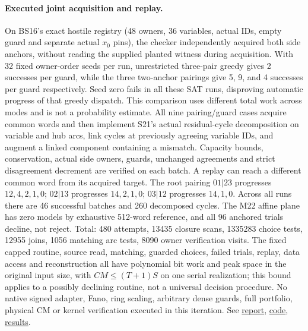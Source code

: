 \documentclass[11pt]{article}
\begin{document}
\paragraph{Executed joint acquisition and replay.}
On BS16's exact hostile registry (48 owners, 36 variables, actual IDs, empty guard and separate actual $x_0$ pins), the checker independently acquired both side anchors, without reading the supplied planted witness during acquisition. With 32 fixed owner-order seeds per run, unrestricted three-pair greedy gives 2 successes per guard, while the three two-anchor pairings give 5, 9, and 4 successes per guard respectively. Seed zero fails in all these SAT runs, disproving automatic progress of that greedy dispatch. This comparison uses different total work across modes and is not a probability estimate. All nine pairing/guard cases acquire common words and then implement S21's actual residual-cycle decomposition on variable and hub arcs, link cycles at previously agreeing variable IDs, and augment a linked component containing a mismatch. Capacity bounds, conservation, actual side owners, guards, unchanged agreements and strict disagreement decrement are verified on each batch. A replay can reach a different common word from its acquired target. The root pairing $01|23$ progresses $12,4,2,1,0$; $02|13$ progresses $14,2,1,0$; $03|12$ progresses $14,1,0$. Across all runs there are 46 successful batches and 260 decomposed cycles. The M22 affine plane has zero models by exhaustive 512-word reference, and all 96 anchored trials decline, not reject. Total: 480 attempts, 13435 closure scans, 1335283 choice tests, 12955 joins, 1056 matching arc tests, 8090 owner verification visits. The fixed capped routine, source read, matching, guarded choices, failed trials, replay, data access and reconstruction all have polynomial bit work and peak space in the original input size, with $CM\le(T+1)S$ on one serial realization; this bound applies to a possibly declining routine, not a universal decision procedure. No native signed adapter, Fano, ring scaling, arbitrary dense guards, full portfolio, physical CM or kernel verification executed in this iteration. See \href{https://github.com/j15marti/pnp/commit/0a938e9ad3068d918d5cd6731a7df8cf0c6fed9e}{report}, \href{https://github.com/j15marti/pnp/commit/b5240ff29e6ba61d33666b6687fe4fd724b8286d}{code}, \href{https://github.com/j15marti/pnp/commit/6812be4580e5785de65b54c7e0d5c63ef126a864}{results}.
\end{document}

